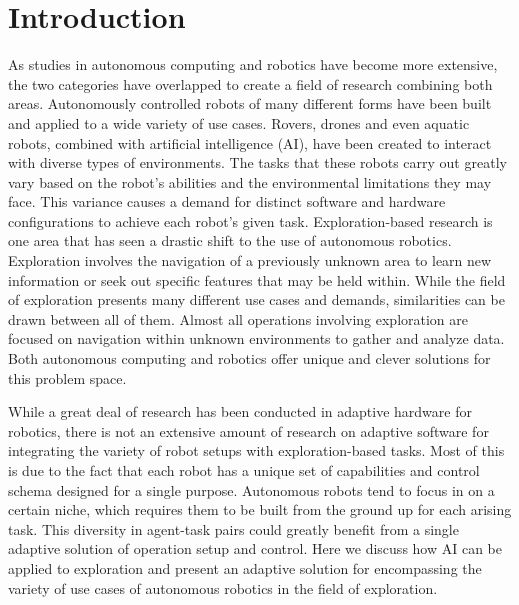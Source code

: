 

\chapter{Introduction} \label{ch:introduction}
As studies in autonomous computing and robotics have become more extensive, the two categories have overlapped to create a field of research combining both areas.
Autonomously controlled robots of many different forms have been built and applied to a wide variety of use cases.
Rovers, drones and even aquatic robots, combined with artificial intelligence (AI), have been created to interact with diverse types of environments.
The tasks that these robots carry out greatly vary based on the robot's abilities and the environmental limitations they may face.
This variance causes a demand for distinct software and hardware configurations to achieve each robot's given task.
Exploration-based research is one area that has seen a drastic shift to the use of autonomous robotics.
Exploration involves the navigation of a previously unknown area to learn new information or seek out specific features that may be held within.
While the field of exploration presents many different use cases and demands, similarities can be drawn between all of them.
Almost all operations involving exploration are focused on navigation within unknown environments to gather and analyze data.
Both autonomous computing and robotics offer unique and clever solutions for this problem space.

While a great deal of research has been conducted in adaptive hardware for robotics, there is not an extensive amount of research on adaptive software for integrating the variety of robot setups with exploration-based tasks.
Most of this is due to the fact that each robot has a unique set of capabilities and control schema designed for a single purpose.
Autonomous robots tend to focus in on a certain niche, which requires them to be built from the ground up for each arising task.
This diversity in agent-task pairs could greatly benefit from a single adaptive solution of operation setup and control.
Here we discuss how AI can be applied to exploration and present an adaptive solution for encompassing the variety of use cases of autonomous robotics in the field of exploration.

